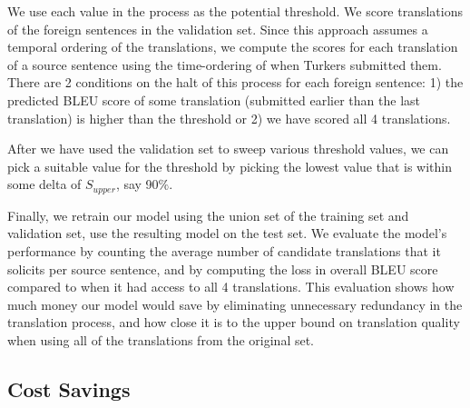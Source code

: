 \documentclass[11pt]{article}
\begin{document}
 We use each value  in the process  as the potential threshold.  We score translations of the foreign sentences in the validation set.  Since this approach assumes a temporal ordering of the translations, we compute the scores for each translation of a source sentence using the time-ordering of when Turkers submitted them. There are 2 conditions on the halt of this process for each foreign sentence: 1) the predicted BLEU score of some translation (submitted earlier than the last translation) is higher than the threshold or 2) we have scored all 4 translations.  


After we have used the validation set to sweep various threshold values,  we can pick a suitable value for the threshold by picking the lowest value that is within some delta of $S_{upper}$, say  90$\%$. 

Finally, we retrain our model using the union set of the training set and validation set, use the resulting model on the test set.  We evaluate the model's performance by counting the average number of candidate translations that it solicits per source sentence, and by computing the loss in overall BLEU score compared to when it had access to all 4 translations.  This evaluation shows how much money our model would save by eliminating unnecessary redundancy in the translation process, and how close it is to the upper bound on translation quality when using all of the translations from the original set.

\subsection{Cost Savings}

\end{document}

